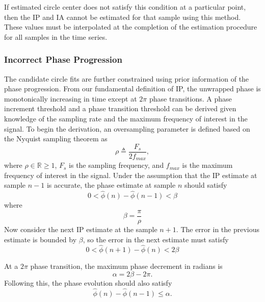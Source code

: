\documentclass[a4paper]{IEEEtran}
\begin{document}
If estimated circle center does not satisfy this condition at a particular point, then the IP and IA cannot be estimated for that sample using this method. These values must be interpolated at the completion of the estimation procedure for all samples in the time series. 

\subsubsection{Incorrect Phase Progression}
The candidate circle fits are further constrained using prior information of the phase progression. From our fundamental definition of IP, the unwrapped phase is monotonically increasing in time except at $2\pi$ phase transitions. A phase increment threshold and a phase transition threshold can be derived given knowledge of the sampling rate and the maximum frequency of interest in the signal. To begin the derivation, an oversampling parameter is defined based on the Nyquist sampling theorem as
\begin{equation}
	\rho\triangleq\frac{F_s}{2f_{max}},
\end{equation}
where $\rho \in \mathbb{R} \ge 1$, $F_s$ is the sampling frequency, and $f_{max}$ is the maximum frequency of interest in the signal. Under the assumption that the IP estimate at sample $n-1$ is accurate, the phase estimate at sample $n$ should satisfy
\begin{equation}
	0 < \hat\phi(n)-\hat\phi(n-1) < \beta
\end{equation}
where 
\begin{equation}
	\beta = \frac{\pi}{\rho}
\end{equation}
Now consider the next IP estimate at the sample $n+1$. The error in the previous estimate is bounded by $\beta$, so the error in the next estimate must satisfy
\begin{equation}\label{eq:Prior1}
	0 < \hat\phi(n+1)-\hat\phi(n) < 2\beta
\end{equation} 

At a $2\pi$ phase transition, the maximum phase decrement in radians is
\begin{equation}
	\alpha=2\beta-2\pi.
\end{equation}
Following this, the phase evolution should also satisfy
\begin{equation}\label{eq:Prior2}
\hat{\phi} \left( n \right) - \hat{\phi} \left( n-1\right) \le \alpha. 
\end{equation}
\end{document}
